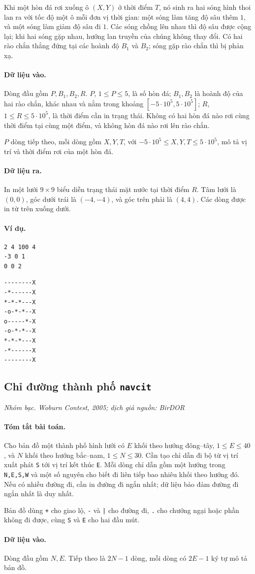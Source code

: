 \documentclass[11pt]{article}
\newcommand{\problem}[4]{%
  \subsection[#1 (#2)]{#1 \hfill {\normalsize\texttt{#2}}}%
  \noindent\textit{#3. #4}\par\smallskip
}
\newcommand{\iosec}[1]{\paragraph{#1}}
\begin{document}
Khi một hòn đá rơi xuống ô \((X,Y)\) ở thời điểm \(T\), nó sinh ra hai sóng
hình thoi lan ra với tốc độ một ô mỗi đơn vị thời gian: một sóng làm tăng độ
sâu thêm \(1\), và một sóng làm giảm độ sâu đi \(1\). Các sóng chồng lên nhau
thì độ sâu được cộng lại; khi hai sóng gặp nhau, hướng lan truyền của chúng
không thay đổi. Có hai rào chắn thẳng đứng tại các hoành độ \(B_1\) và
\(B_2\); sóng gặp rào chắn thì bị phản xạ.

\iosec{Dữ liệu vào.}
Dòng đầu gồm \(P,B_1,B_2,R\). \(P\), \(1\le P\le 5\), là số hòn đá;
\(B_1,B_2\) là hoành độ của hai rào chắn, khác nhau và nằm trong khoảng
\([-5\cdot 10^5,5\cdot 10^5]\); \(R\), \(1\le R\le 5\cdot 10^5\), là thời
điểm cần in trạng thái. Không có hai hòn đá nào rơi cùng thời điểm tại cùng
một điểm, và không hòn đá nào rơi lên rào chắn.

\(P\) dòng tiếp theo, mỗi dòng gồm \(X,Y,T\), với
\(-5\cdot 10^5\le X,Y,T\le 5\cdot 10^5\), mô tả vị trí và thời điểm rơi của
một hòn đá.

\iosec{Dữ liệu ra.}
In một lưới \(9\times 9\) biểu diễn trạng thái mặt nước tại thời điểm \(R\).
Tâm lưới là \((0,0)\), góc dưới trái là \((-4,-4)\), và góc trên phải là
\((4,4)\). Các dòng được in từ trên xuống dưới.

\iosec{Ví dụ.}
\begin{verbatim}
2 4 100 4
-3 0 1
0 0 2
\end{verbatim}

\begin{verbatim}
--------X
-*------X
*-*-*---X
-o-*-*--X
o-----*-X
-o-*-*--X
*-*-*---X
-*------X
--------X
\end{verbatim}

\problem{Chỉ đường thành phố}{navcit}{Nhóm bạc}{Woburn Contest, 2005; dịch giả nguồn: BirDOR}

\iosec{Tóm tắt bài toán.}
Cho bản đồ một thành phố hình lưới có \(E\) khối theo hướng đông--tây,
\(1\le E\le 40\), và \(N\) khối theo hướng bắc--nam, \(1\le N\le 30\). Cần
tạo chỉ dẫn đi bộ từ vị trí xuất phát \texttt{S} tới vị trí kết thúc
\texttt{E}. Mỗi dòng chỉ dẫn gồm một hướng trong \texttt{N,E,S,W} và một số
nguyên cho biết đi liên tiếp bao nhiêu khối theo hướng đó. Nếu có nhiều đường
đi, cần in đường đi ngắn nhất; dữ liệu bảo đảm đường đi ngắn nhất là duy nhất.

Bản đồ dùng \texttt{+} cho giao lộ, \texttt{-} và \texttt{|} cho đường đi,
\texttt{.} cho chướng ngại hoặc phần không đi được, cùng \texttt{S} và
\texttt{E} cho hai đầu mút.

\iosec{Dữ liệu vào.}
Dòng đầu gồm \(N,E\). Tiếp theo là \(2N-1\) dòng, mỗi dòng có \(2E-1\) ký tự
mô tả bản đồ.
\end{document}
